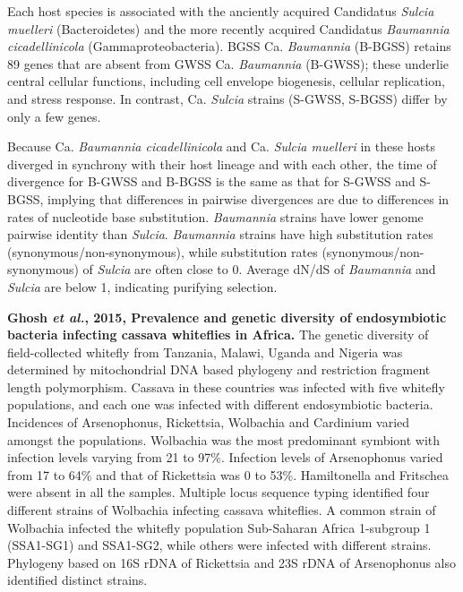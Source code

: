 \documentclass[11pt]{article}
\begin{document}
\begin{sloppypar}
Each host species is associated with the anciently acquired Candidatus \textit{Sulcia muelleri} (Bacteroidetes) and the more recently acquired Candidatus \textit{Baumannia cicadellinicola} (Gammaproteobacteria). 
BGSS Ca. \textit{Baumannia} (B-BGSS) retains 89 genes that are absent from GWSS Ca. \textit{Baumannia} (B-GWSS); these underlie central cellular functions, including cell envelope biogenesis, cellular replication, and stress response. 
In contrast, Ca. \textit{Sulcia} strains (S-GWSS, S-BGSS) differ by only a few genes.
\par
Because Ca. \textit{Baumannia cicadellinicola} and Ca. \textit{Sulcia muelleri} in these hosts diverged in synchrony with their host lineage and with each other, the time of divergence for B-GWSS and B-BGSS is the same as that for S-GWSS and S-BGSS, implying that differences in pairwise divergences are due to differences in rates of nucleotide base substitution. 
\textit{Baumannia} strains have lower genome pairwise identity than \textit{Sulcia}. 
\textit{Baumannia} strains have high substitution rates (synonymous/non-synonymous), while substitution rates (synonymous/non-synonymous) of \textit{Sulcia} are often close to 0. 
Average dN/dS of \textit{Baumannia} and \textit{Sulcia} are below 1, indicating purifying selection. 
\par
\textbf{Ghosh \textit{et al.}, 2015, Prevalence and genetic diversity of endosymbiotic bacteria infecting cassava whiteflies in Africa.} \newline
The genetic diversity of field-collected whitefly from Tanzania, Malawi, Uganda and Nigeria was determined by mitochondrial DNA based phylogeny and restriction fragment length polymorphism. 
Cassava in these countries was infected with five whitefly populations, and each one was infected with different endosymbiotic bacteria. 
Incidences of Arsenophonus, Rickettsia, Wolbachia and Cardinium varied amongst the populations. 
Wolbachia was the most predominant symbiont with infection levels varying from 21 to 97\%. 
Infection levels of Arsenophonus varied from 17 to 64\% and that of Rickettsia was 0 to 53\%. 
Hamiltonella and Fritschea were absent in all the samples. 
Multiple locus sequence typing identified four different strains of Wolbachia infecting cassava whiteflies. 
A common strain of Wolbachia infected the whitefly population Sub-Saharan Africa 1-subgroup 1 (SSA1-SG1) and SSA1-SG2, while others were infected with different strains. 
Phylogeny based on 16S rDNA of Rickettsia and 23S rDNA of Arsenophonus also identified distinct strains.

\end{sloppypar}
\end{document}
